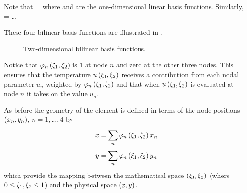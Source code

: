 Note that
 =  
where  and  are the one-dimensional linear basis
functions. Similarly,  =
 \ldots \etc

These four bilinear basis functions are illustrated in .
\begin{figure}[htbp] \centering
  
  \caption{Two-dimensional bilinear basis functions.}
  \label{fig:2Dbbf}
\end{figure}

Notice that $   \varphi_{n} \left( \xi_{1},\xi_{2} \right)  $ is $1$ at node $n$ and zero at the
other three nodes.  This ensures that the temperature
$ u\left( \xi_{1},\xi_{2} \right) $ receives a contribution from each nodal parameter
$u_{n}$ weighted by $   \varphi_{n} \left( \xi_{1},\xi_{2} \right)  $ and that when
$ u\left( \xi_{1},\xi_{2} \right) $ is evaluated at node $n$ it takes on the value
$u_{n}$.

As before the geometry of the element is defined in terms of the node
positions $\left( x_{n},y_{n} \right)$, $n=1,\ldots,4$ by
\begin{align*}
  x &=  \displaystyle\sum_{n}^{}     \varphi_{n} \left( \xi_{1},\xi_{2} \right)   x_{n} \\ 
  y &=  \displaystyle\sum_{n}^{}     \varphi_{n} \left( \xi_{1},\xi_{2} \right)   y_{n}
\end{align*}
which provide the mapping between the mathematical space $\left( \xi_{1}, \xi_{2} \right)$
(where $0 \leq \xi_{1},  \xi_{2} \leq 1$) and the physical space $\left( x,y \right)$.



%    
%    

